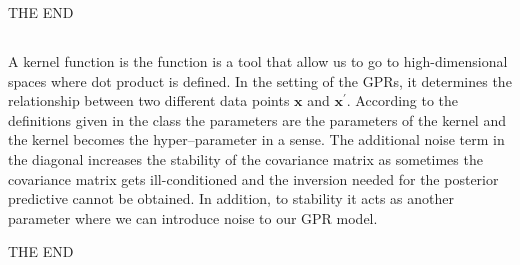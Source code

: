 \documentclass{article}
\begin{document}
\begin{center}
   THE END
\end{center}

\subsection{}

A kernel function is the function is a tool that allow us to go to high-dimensional spaces where dot product is defined. In the setting of the GPRs, it determines the relationship between two different data points $\mathbf{x}$ and $\mathbf{x}^\prime$. According to the definitions given in the class the parameters are the parameters of the kernel and the kernel becomes the hyper--parameter in a sense. The additional noise term in the diagonal increases the stability of the covariance matrix as sometimes the covariance matrix gets ill-conditioned and the inversion needed for the posterior predictive cannot be obtained. In addition, to stability it acts as another parameter where we can introduce noise to our GPR model.

\begin{center}
   THE END
\end{center}
\end{document}
